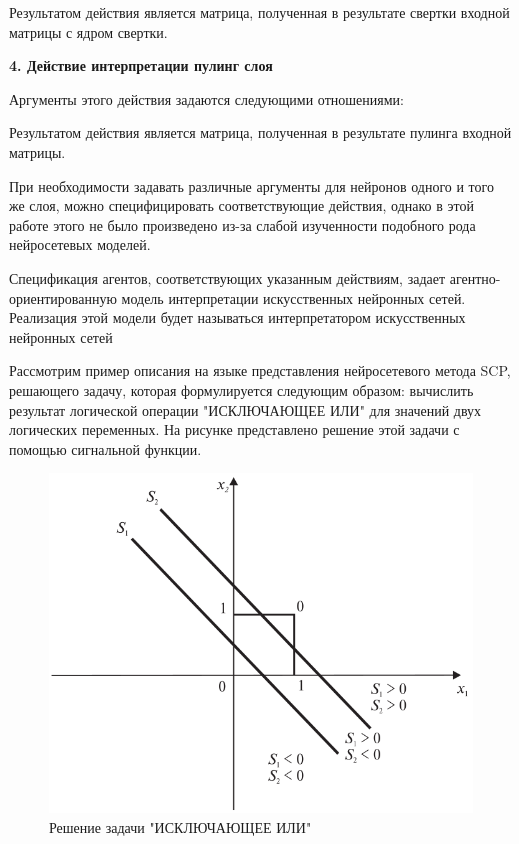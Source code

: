 Результатом действия является матрица, полученная в результате свертки входной матрицы с ядром свертки.


\textbf{4. Действие интерпретации пулинг слоя}

Аргументы этого действия задаются следующими отношениями:
\begin{SCn}



\end{SCn}

Результатом действия является матрица, полученная в результате пулинга входной матрицы.

При необходимости задавать различные аргументы для нейронов одного и того же слоя, можно специфицировать соответствующие действия, однако в этой работе этого не было произведено из-за слабой изученности подобного рода нейросетевых моделей.

Спецификация агентов, соответствующих указанным действиям, задает агентно-ориентированную модель интерпретации искусственных нейронных сетей. Реализация этой модели будет называться интерпретатором искусственных нейронных сетей

Рассмотрим пример описания на языке представления нейросетевого метода SCP, решающего задачу, которая формулируется следующим образом: вычислить результат логической операции "ИСКЛЮЧАЮЩЕЕ ИЛИ" для значений двух логических переменных. На рисунке \textit{} представлено решение этой задачи с помощью сигнальной функции.

\begin{figure}
	\centering
	\includegraphics[width=0.5\linewidth]{author/part3/figures/strong_or_graphic.png}
	\caption{Решение задачи "ИСКЛЮЧАЮЩЕЕ ИЛИ"}
	\label{fig:strong_or_graphic}
\end{figure}

